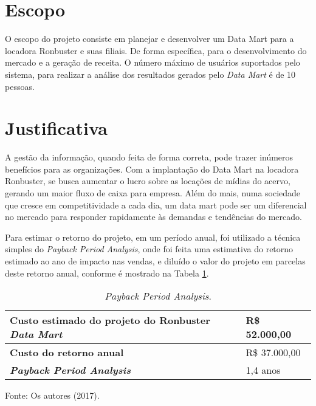 \section{Escopo}

O escopo do projeto consiste em planejar e 
desenvolver um Data Mart para a locadora Ronbuster 
e suas filiais. De forma específica, para o 
desenvolvimento do mercado e a geração de receita.  
O número máximo de usuários suportados pelo sistema, 
para realizar a análise dos resultados gerados pelo 
\textit{Data Mart} é de 10 pessoas. 


\section{Justificativa}

A gestão da informação, quando feita de forma correta, pode trazer inúmeros benefícios para as organizações. Com a implantação do Data Mart na locadora Ronbuster, se busca aumentar o lucro sobre as locações de mídias do acervo, gerando um maior fluxo de caixa para empresa. Além do mais, numa sociedade que cresce em competitividade a cada dia, um data mart pode ser um diferencial no mercado para responder rapidamente às demandas e tendências do mercado.

Para estimar o retorno do projeto, em um período anual, 
foi utilizado a técnica simples do 
\textit{Payback Period Analysis}, onde foi feita uma 
estimativa do retorno estimado ao ano de 
impacto nas vendas, e diluído o valor do 
projeto em parcelas deste retorno anual, 
conforme é mostrado na Tabela \ref{tab:justificativa}.

\begin{table}[!htb]
    \begin{center}
        \caption{\textit{Payback Period Analysis}.} \label{tab:justificativa}
        \begin{tabular}{ p{6cm} | p{3cm} }
            \hline
            \textbf{Custo estimado do projeto do Ronbuster \textit{Data Mart}} & R\$ 52.000,00 \\
            \hline
            \textbf{Custo do retorno anual} & R\$ 37.000,00 \\
            \hline
            \textbf{\textit{Payback Period Analysis}} & 1,4 anos \\
            \hline
        \end{tabular}
    \end{center}
    Fonte: Os autores (2017).
\end{table}

